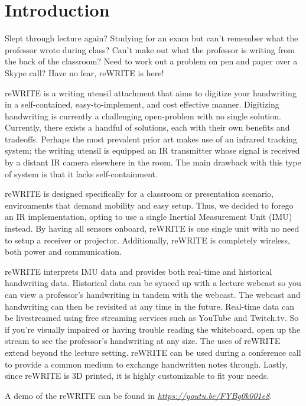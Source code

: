 \documentclass[10pt,journal]{IEEEtran}
\begin{document}
\section{Introduction}
\par Slept through lecture again? Studying for an exam but can't remember what the professor wrote during class? Can't make out what the professor is writing from the back of the classroom? Need to work out a problem on pen and paper over a Skype call? Have no fear, reWRITE is here!
\par reWRITE is a writing utensil attachment that aims to digitize your handwriting in a self-contained, easy-to-implement, and cost effective manner. Digitizing handwriting is currently a challenging open-problem with no single solution. Currently, there exists a handful of solutions, each with their own benefits and tradeoffs. Perhaps the most prevalent prior art makes use of an infrared tracking system; the writing utensil is equipped an IR transmitter whose signal is received by a distant IR camera elsewhere in the room. The main drawback with this type of system is that it lacks self-containment.
\par reWRITE is designed specifically for a classroom or presentation scenario, environments that demand mobility and easy setup. Thus, we decided to forego an IR implementation, opting to use a single Inertial Measurement Unit (IMU) instead. By having all sensors onboard, reWRITE is one single unit with no need to setup a receiver or projector. Additionally, reWRITE is completely wireless, both power and communication.
\par reWRITE interprets IMU data and provides both real-time and historical handwriting data. Historical data can be synced up with a lecture webcast so you can view a professor's handwriting in tandem with the webcast. The webcast and handwriting can then be revisited at any time in the future. Real-time data can be livestreamed using free streaming services such as YouTube and Twitch.tv. So if you're visually impaired or having trouble reading the whiteboard, open up the stream to see the professor's handwriting at any size. The uses of reWRITE extend beyond the lecture setting. reWRITE can be used during a conference call to provide a common medium to exchange handwritten notes through. Lastly, since reWRITE is 3D printed, it is highly customizable to fit your needs.
\par A demo of the reWRITE can be found in \textit{\url{https://youtu.be/FYBg0k001e8}}.
\end{document}
